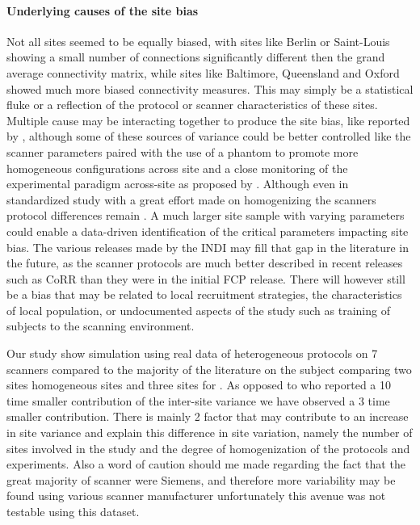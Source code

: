 \documentclass[authoryear]{elsarticle}
\begin{document}
\paragraph{Underlying causes of the site bias}
Not all sites seemed to be equally biased, with sites like Berlin or Saint-Louis showing a small number of connections significantly different then the grand average connectivity matrix, while sites like Baltimore, Queensland and Oxford showed much more biased connectivity measures. This may simply be a statistical fluke or a reflection of the protocol or scanner characteristics of these sites. Multiple cause may be interacting together to produce the site bias, like reported by \cite{Yan2013a}, although some of these sources of variance could be better controlled like the scanner parameters paired with the use of a phantom to promote more homogeneous configurations across site and a close monitoring of the experimental paradigm across-site as proposed by \cite{Friedman2006,Friedman2006a,Glover2012}. Although even in standardized study with a great effort made on homogenizing the scanners protocol differences remain \cite{Brown2011}. A much larger site sample with varying parameters could enable a data-driven identification of the critical parameters impacting site bias. The various releases made by the INDI may fill that gap in the literature in the future, as the scanner protocols are much better described in recent releases such as CoRR than they were in the initial FCP release. There will however still be a bias that may be related to local recruitment strategies, the characteristics of local population, or undocumented aspects of the study such as training of subjects to the scanning environment. 

Our study show simulation using real data of heterogeneous protocols on 7 scanners compared to the majority of the literature on the subject comparing two sites homogeneous sites \citep{Costafreda2007,Suckling2008,Sutton2008,Glover2012} and three sites for \cite{Gountouna2010}. As opposed to \cite{Sutton2008,Brown2011} who reported a 10 time smaller contribution of the inter-site variance we have observed a 3 time smaller contribution. There is mainly 2 factor that may contribute to an increase in site variance and explain this difference in site variation, namely the number of sites involved in the study and the degree of homogenization of the protocols and experiments. Also a word of caution should me made regarding the fact that the great majority of scanner were Siemens, and therefore more variability may be found using various scanner manufacturer unfortunately this avenue was not testable using this dataset.
\end{document}
